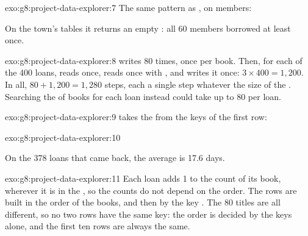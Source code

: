 \begin{solution}{exo:g8:project-data-explorer:7}
The same pattern as , on members:

\label{lst:g8:project-data-explorer:sol-members}

On the town's tables it returns an empty : all 60 members borrowed at
least once.
\end{solution}

\begin{solution}{exo:g8:project-data-explorer:8}
 writes 80 times, once per book. Then, for each of the 400
loans,  reads  once, reads 
once with , and writes it once: $3 \times 400 = 1{,}200$. In all,
$80 + 1{,}200 = 1{,}280$ steps, each a single step whatever the size of the
. Searching the  of books for each loan instead could take up
to 80  per loan.
\end{solution}

\begin{solution}{exo:g8:project-data-explorer:9}
 takes the  from the keys of the first row:

\label{lst:g8:project-data-explorer:sol-csv}
\end{solution}

\begin{solution}{exo:g8:project-data-explorer:10}
\label{lst:g8:project-data-explorer:sol-length}

On the 378 loans that came back, the average is 17.6 days.
\end{solution}

\begin{solution}{exo:g8:project-data-explorer:11}
Each loan adds 1 to the count of its book, wherever it is in the , so the
counts do not depend on the order. The rows are built in the order of the
books, and then  by the key . The 80 titles are all
different, so no two rows have the same key: the  order is decided by
the keys alone, and the first ten rows are always the same.
\end{solution}

